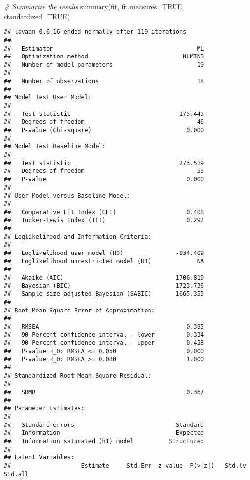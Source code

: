 \documentclass[
]{article}
\newenvironment{Shaded}{\begin{snugshade}}{\end{snugshade}}
\newcommand{\AttributeTok}[1]{\textcolor[rgb]{0.77,0.63,0.00}{#1}}
\newcommand{\CommentTok}[1]{\textcolor[rgb]{0.56,0.35,0.01}{\textit{#1}}}
\newcommand{\ConstantTok}[1]{\textcolor[rgb]{0.00,0.00,0.00}{#1}}
\newcommand{\FunctionTok}[1]{\textcolor[rgb]{0.00,0.00,0.00}{#1}}
\newcommand{\NormalTok}[1]{#1}
\begin{document}
\begin{Shaded}
\begin{Highlighting}[]
\CommentTok{\# Summarize the results}
\FunctionTok{summary}\NormalTok{(fit, }\AttributeTok{fit.measures=}\ConstantTok{TRUE}\NormalTok{, }\AttributeTok{standardized=}\ConstantTok{TRUE}\NormalTok{)}
\end{Highlighting}
\end{Shaded}

\begin{verbatim}
## lavaan 0.6.16 ended normally after 119 iterations
## 
##   Estimator                                         ML
##   Optimization method                           NLMINB
##   Number of model parameters                        19
## 
##   Number of observations                            18
## 
## Model Test User Model:
##                                                       
##   Test statistic                               175.445
##   Degrees of freedom                                46
##   P-value (Chi-square)                           0.000
## 
## Model Test Baseline Model:
## 
##   Test statistic                               273.519
##   Degrees of freedom                                55
##   P-value                                        0.000
## 
## User Model versus Baseline Model:
## 
##   Comparative Fit Index (CFI)                    0.408
##   Tucker-Lewis Index (TLI)                       0.292
## 
## Loglikelihood and Information Criteria:
## 
##   Loglikelihood user model (H0)               -834.409
##   Loglikelihood unrestricted model (H1)             NA
##                                                       
##   Akaike (AIC)                                1706.819
##   Bayesian (BIC)                              1723.736
##   Sample-size adjusted Bayesian (SABIC)       1665.355
## 
## Root Mean Square Error of Approximation:
## 
##   RMSEA                                          0.395
##   90 Percent confidence interval - lower         0.334
##   90 Percent confidence interval - upper         0.458
##   P-value H_0: RMSEA <= 0.050                    0.000
##   P-value H_0: RMSEA >= 0.080                    1.000
## 
## Standardized Root Mean Square Residual:
## 
##   SRMR                                           0.367
## 
## Parameter Estimates:
## 
##   Standard errors                             Standard
##   Information                                 Expected
##   Information saturated (h1) model          Structured
## 
## Latent Variables:
##                    Estimate     Std.Err  z-value  P(>|z|)   Std.lv     Std.all

\end{verbatim}
\end{document}
